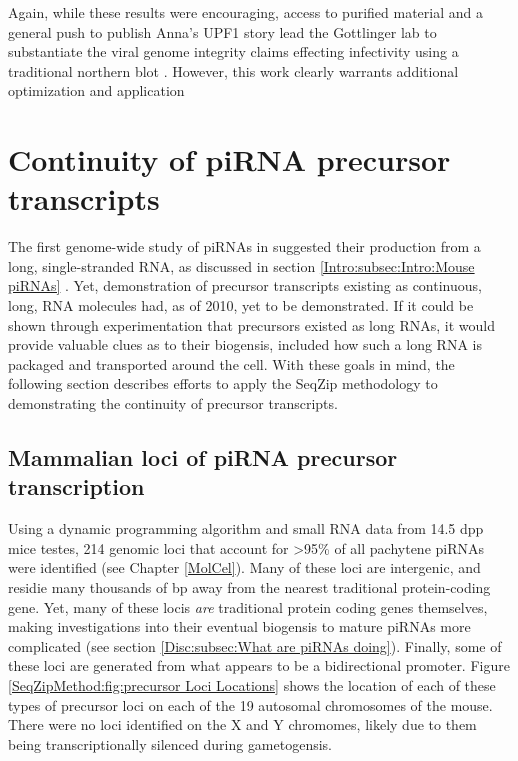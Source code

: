     Again, while these results were encouraging, access to purified material and a general push to publish Anna's UPF1 story lead the Gottlinger lab to substantiate the viral genome integrity claims effecting infectivity using a traditional northern blot \citep{Serquina2013a}. However, this work clearly warrants additional optimization and application

\section{Continuity of piRNA precursor transcripts}
  \label{SeqZipMethod:sec:Demonstrating continuous precursor TX by SeqZip}

  The first genome-wide study of piRNAs in \flies{} suggested their production from a long, single-stranded RNA, as discussed in section \ref{Intro:subsec:Intro:Mouse piRNAs} \citep{Brennecke2007}. Yet, demonstration of precursor transcripts existing as continuous, long, RNA molecules had, as of 2010, yet to be demonstrated. If it could be shown through experimentation that precursors existed as long RNAs, it would provide valuable clues as to their biogensis, included how such a long RNA is packaged and transported around the cell. With these goals in mind, the following section describes efforts to apply the SeqZip methodology to demonstrating the continuity of precursor transcripts.

  \subsection{Mammalian loci of piRNA precursor transcription}
    \label{SeqZipMethod:subsec:Mammalian Loci of precursor Tx}

    Using a dynamic programming algorithm and small RNA data from 14.5 dpp mice testes, 214 genomic loci that account for >95\% of all pachytene piRNAs were identified (see Chapter \ref{MolCel}). Many of these loci are intergenic, and residie many thousands of bp away from the nearest traditional protein-coding gene. Yet, many of these locis \textit{are} traditional protein coding genes themselves, making investigations into their eventual biogensis to mature piRNAs more complicated (see section \ref{Disc:subsec:What are piRNAs doing}). Finally, some of these loci are generated from what appears to be a bidirectional promoter. Figure \ref{SeqZipMethod:fig:precursor Loci Locations} shows the location of each of these types of precursor loci on each of the 19 autosomal chromosomes of the mouse. There were no loci identified on the X and Y chromomes, likely due to them being transcriptionally silenced during gametogensis. 

